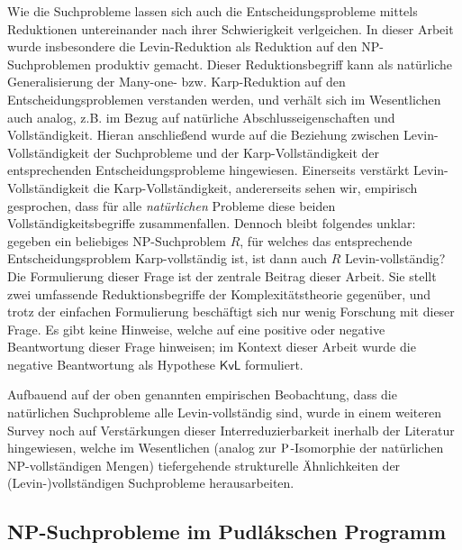 Wie die Suchprobleme lassen sich auch die Entscheidungsprobleme mittels Reduktionen untereinander nach ihrer Schwierigkeit verlgeichen. In dieser Arbeit wurde insbesondere die Levin-Reduktion als Reduktion auf den NP-Suchproblemen produktiv gemacht. Dieser Reduktionsbegriff kann als natürliche Generalisierung der Many-one- bzw. Karp-Reduktion auf den Entscheidungsproblemen verstanden werden, und verhält sich im Wesentlichen auch analog, z.B. im Bezug auf natürliche Abschlusseigenschaften und Vollständigkeit. Hieran anschließend wurde auf die Beziehung zwischen Levin-Vollständigkeit der Suchprobleme und der Karp-Vollständigkeit der entsprechenden Entscheidungsprobleme hingewiesen. Einerseits verstärkt Levin-Vollständigkeit die Karp-Vollständigkeit, andererseits sehen wir, empirisch gesprochen, dass für alle \emph{natürlichen} Probleme diese beiden Vollständigkeitsbegriffe zusammenfallen. 
Dennoch bleibt folgendes unklar: gegeben ein beliebiges NP-Suchproblem $R$, für welches das entsprechende Entscheidungsproblem Karp-vollständig ist, ist dann auch $R$ Levin-vollständig?
Die Formulierung dieser Frage ist der zentrale Beitrag dieser Arbeit.
Sie stellt zwei umfassende Reduktionsbegriffe der Komplexitätstheorie gegenüber, und trotz der einfachen Formulierung beschäftigt sich nur wenig Forschung mit dieser Frage.
Es gibt keine Hinweise, welche auf eine positive oder negative Beantwortung dieser Frage hinweisen; im Kontext dieser Arbeit wurde die negative Beantwortung als Hypothese $\mathsf{KvL}$ formuliert.


Aufbauend auf der oben genannten empirischen Beobachtung, dass die natürlichen Suchprobleme alle Levin-vollständig sind, wurde in einem weiteren Survey noch auf Verstärkungen dieser Interreduzierbarkeit inerhalb der Literatur hingewiesen, welche im Wesentlichen (analog zur $\P$-Isomorphie der natürlichen NP-vollständigen Mengen) tiefergehende strukturelle Ähnlichkeiten der (Levin-)vollständigen Suchprobleme herausarbeiten.

\subsection*{NP-Suchprobleme im Pudlákschen Programm}

